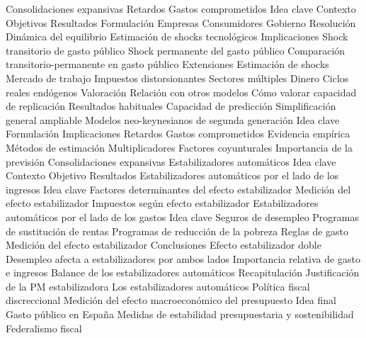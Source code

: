 \documentclass{nuevotema}
\begin{document}
\begin{esquema}[enumerate]
			\3 Consolidaciones expansivas
			\3 Retardos
			\3 Gastos comprometidos
	\1 
		\2 Idea clave
			\3 Contexto
			\3 Objetivos
			\3 Resultados
		\2 Formulación
			\3 Empresas
			\3 Consumidores
			\3 Gobierno
			\3 Resolución
			\3 Dinámica del equilibrio
			\3 Estimación de shocks tecnológicos
		\2 Implicaciones
			\3 Shock transitorio de gasto público
			\3 Shock permanente del gasto público
			\3 Comparación transitorio-permanente en gasto público
		\2 Extensiones
			\3 Estimación de shocks
			\3 Mercado de trabajo
			\3 Impuestos distorsionantes
			\3 Sectores múltiples
			\3 Dinero
			\3 Ciclos reales endógenos
		\2 Valoración
			\3 Relación con otros modelos
			\3 Cómo valorar capacidad de replicación
			\3 Resultados habituales
			\3 Capacidad de predicción
			\3 Simplificación general ampliable
	\1 
		\2 Modelos neo-keynesianos de segunda generación
			\3 Idea clave
			\3 Formulación
			\3 Implicaciones
			\3 Retardos
			\3 Gastos comprometidos
		\2 Evidencia empírica
			\3 Métodos de estimación
			\3 Multiplicadores
			\3 Factores coyunturales
			\3 Importancia de la previsión
			\3 Consolidaciones expansivas
			\3 Estabilizadores automáticos
	\1 
		\2 Idea clave
			\3 Contexto
			\3 Objetivo
			\3 Resultados
		\2 Estabilizadores automáticos por el lado de los ingresos
			\3 Idea clave
			\3 Factores determinantes del efecto estabilizador
			\3 Medición del efecto estabilizador
			\3 Impuestos según efecto estabilizador
		\2 Estabilizadores automáticos por el lado de los gastos
			\3 Idea clave
			\3 Seguros de desempleo
			\3 Programas de sustitución de rentas
			\3 Programas de reducción de la pobreza
			\3 Reglas de gasto
			\3 Medición del efecto estabilizador
		\2 Conclusiones
			\3 Efecto estabilizador doble
			\3 Desempleo afecta a estabilizadores por ambos lados
			\3 Importancia relativa de gasto e ingresos
			\3 Balance de los estabilizadores automáticos
	\1[] 
		\2 Recapitulación
			\3 Justificación de la PM estabilizadora
			\3 Los estabilizadores automáticos
			\3 Política fiscal discreccional
			\3 Medición del efecto macroeconómico del presupuesto
		\2 Idea final
			\3 Gasto público en España
			\3 Medidas de estabilidad presupuestaria y sostenibilidad
			\3 Federalismo fiscal

\end{esquema}

\esquemalargo
\end{document}
